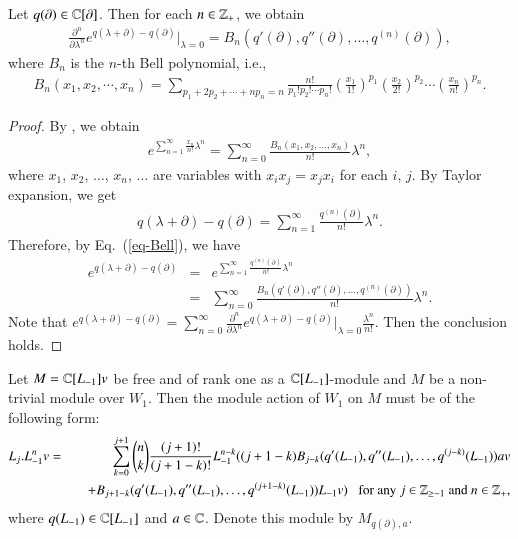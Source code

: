 \documentclass[12pt]{amsart}
\begin{document}
\begin{lem}\label{lem-w1}
Let $q(\partial)\in \mathbb{C}[\partial]$. Then for each $n\in \mathbb{Z}_+$, we obtain
\begin{eqnarray}
{\frac{\partial^n}{\partial\lambda^n}e^{q(\lambda+\partial)-q(\partial)}}|_{\lambda=0}=B_n(q'(\partial), q''(\partial), \ldots, q^{(n)}(\partial)),
\end{eqnarray}
where $B_n$ is the $n$-th Bell polynomial, i.e.,
\begin{eqnarray*}
B_n(x_1,x_2,\cdots, x_n)=\sum_{p_1+2p_2+\cdots+np_n=n}\frac{n!}{p_1!p_2!\cdots p_n!}(\frac{x_1}{1!})^{p_1}(\frac{x_2}{2!})^{p_2}\cdots (\frac{x_n}{n!})^{p_n}.
\end{eqnarray*}
\end{lem}
\begin{proof}
By \cite[Section 3.3]{C}, we obtain
\begin{eqnarray}\label{eq-Bell}
e^{\sum_{n=1}^\infty\frac{x_n}{n!}\lambda^n}=\sum_{n=0}^\infty\frac{B_n(x_1, x_2, \ldots,x_n)}{n!}\lambda^n,
\end{eqnarray}
where $x_1$, $x_2$, $\ldots$, $x_n$, $\ldots$ are variables with $x_ix_j=x_jx_i$ for each $i$, $j$.
By Taylor expansion, we get
\begin{eqnarray}
q(\lambda+\partial)-q(\partial)=\sum_{n=1}^\infty\frac{q^{(n)}(\partial)}{n!}\lambda^n.
\end{eqnarray}
Therefore, by Eq.~(\ref{eq-Bell}), we have
\begin{eqnarray*}
e^{q(\lambda+\partial)-q(\partial)}&=&e^{\sum_{n=1}^\infty\frac{q^{(n)}(\partial)}{n!}\lambda^n}\\
&=&\sum_{n=0}^\infty\frac{B_n(q'(\partial), q''(\partial),\ldots,q^{(n)}(\partial))}{n!}\lambda^n.
\end{eqnarray*}
Note that $e^{q(\lambda+\partial)-q(\partial)}=\sum_{n=0}^\infty
\frac{\partial^n}{\partial\lambda^n}e^{q(\lambda+\partial)-q(\partial)}|_{\lambda=0}\frac{\lambda^n}{n!}$.
Then the conclusion holds.
\end{proof}
\begin{thm}\label{thm-3}
Let $M=\mathbb{C}[L_{-1}]v$ be free and of rank one as a $\mathbb{C}[L_{-1}]$-module and $M$ be a non-trivial module over $W_1$. Then the module action of $W_1$ on $M$ must be of the following form:
\begin{eqnarray*}
L_{j}. L_{-1}^nv&=&\sum_{k=0}^{j+1}\binom{n}{k}\frac{(j+1)!}{(j+1-k)!}L_{-1}^{n-k}((j+1-k)B_{j-k}(q'(L_{-1}), q''(L_{-1}),\ldots, q^{(j-k)}(L_{-1}))av\\
&&\quad+B_{j+1-k}(q'(L_{-1}), q''(L_{-1}),\ldots, q^{(j+1-k)}(L_{-1}))L_{-1} v)\;\;\text{ for any $j\in \mathbb{Z}_{\geq -1}$ and $n\in \mathbb{Z}_+$,}
\end{eqnarray*}
where $q(L_{-1})\in \mathbb{C}[L_{-1}]$ and $a\in \mathbb{C}$. Denote this module by $M_{q(\partial), a}$. %
\end{thm}
\end{document}
